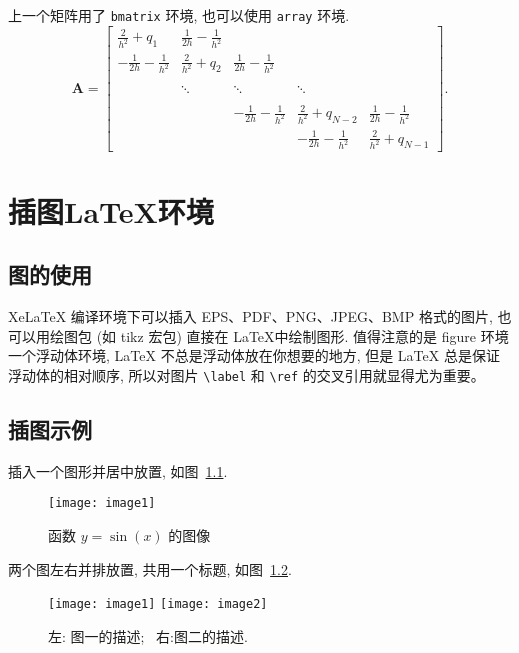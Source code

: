 \documentclass[openany,twoside,12pt]{book}
\theoremstyle{plain}
\begin{document}
上一个矩阵用了 \verb|bmatrix| 环境, 也可以使用 \verb|array| 环境.
\begin{equation}\label{eq:matrix2}
\boldsymbol{A}=\left[\begin{array}{cccccc}
\frac{2}{h^{2}}+q_{1} & \frac{1}{2h}-\frac{1}{h^{2}} &  &  &  \\[8pt]
 -\frac{1}{2h}-\frac{1}{h^{2}} & \frac{2}{h^{2}}+q_{2} & \frac{1}{2h}-\frac{1}{h^{2}}  & &  \\[8pt]
  &  &  &  &   \\
  &  \ddots  & \ddots & \ddots &  \\[8pt]
  &  &  &  &   \\
  &   & -\frac{1}{2h}-\frac{1}{h^{2}} & \frac{2}{h^{2}}+q_{N-2} & \frac{1}{2h}-\frac{1}{h^{2}} \\[8pt]
  &  &  & -\frac{1}{2h}-\frac{1}{h^{2}} & \frac{2}{h^{2}}+q_{N-1}
\end{array}\right].
\end{equation}



\chapter{插图LaTeX环境}

\section{图的使用}

XeLaTeX 编译环境下可以插入 EPS、PDF、PNG、JPEG、BMP 格式的图片, 也可以用绘图包 (如 tikz 宏包) 直接在 \LaTeX 中绘制图形. 值得注意的是 figure 环境一个浮动体环境, LaTeX 不总是浮动体放在你想要的地方, 但是 LaTeX 总是保证浮动体的相对顺序, 所以对图片 \verb|\label| 和 \verb|\ref| 的交叉引用就显得尤为重要。

\section{插图示例}

插入一个图形并居中放置, 如图~\ref{fig:sinx}.
\begin{figure}[htp!]
  \centering
  \texttt{[image: image1]}
  \caption{函数 $y=\sin(x)$ 的图像}\label{fig:sinx}
\end{figure}

\clearpage
两个图左右并排放置, 共用一个标题, 如图~\ref{fig:twofigs}.
\begin{figure}[htp!]
  \centering
  \texttt{[image: image1]}
  \hfill
  \texttt{[image: image2]}
  \caption{左: 图一的描述;~ 右:图二的描述.}
  \label{fig:twofigs}
\end{figure}
\end{document}
